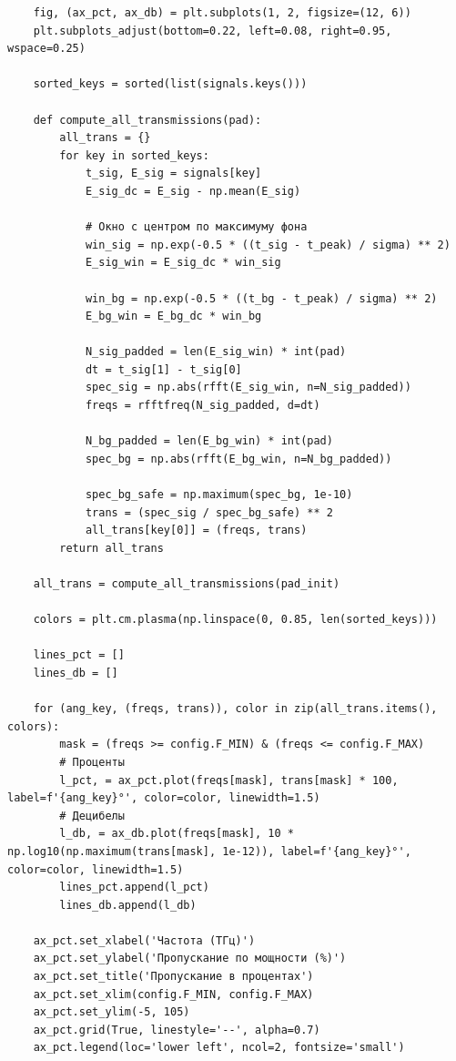\begin{verbatim}
    fig, (ax_pct, ax_db) = plt.subplots(1, 2, figsize=(12, 6))
    plt.subplots_adjust(bottom=0.22, left=0.08, right=0.95, wspace=0.25)
    
    sorted_keys = sorted(list(signals.keys()))
    
    def compute_all_transmissions(pad):
        all_trans = {}
        for key in sorted_keys:
            t_sig, E_sig = signals[key]
            E_sig_dc = E_sig - np.mean(E_sig)
            
            # Окно с центром по максимуму фона
            win_sig = np.exp(-0.5 * ((t_sig - t_peak) / sigma) ** 2)
            E_sig_win = E_sig_dc * win_sig
            
            win_bg = np.exp(-0.5 * ((t_bg - t_peak) / sigma) ** 2)
            E_bg_win = E_bg_dc * win_bg
            
            N_sig_padded = len(E_sig_win) * int(pad)
            dt = t_sig[1] - t_sig[0]
            spec_sig = np.abs(rfft(E_sig_win, n=N_sig_padded))
            freqs = rfftfreq(N_sig_padded, d=dt)
            
            N_bg_padded = len(E_bg_win) * int(pad)
            spec_bg = np.abs(rfft(E_bg_win, n=N_bg_padded))
            
            spec_bg_safe = np.maximum(spec_bg, 1e-10)
            trans = (spec_sig / spec_bg_safe) ** 2
            all_trans[key[0]] = (freqs, trans)
        return all_trans

    all_trans = compute_all_transmissions(pad_init)
    
    colors = plt.cm.plasma(np.linspace(0, 0.85, len(sorted_keys)))
    
    lines_pct = []
    lines_db = []
    
    for (ang_key, (freqs, trans)), color in zip(all_trans.items(), colors):
        mask = (freqs >= config.F_MIN) & (freqs <= config.F_MAX)
        # Проценты
        l_pct, = ax_pct.plot(freqs[mask], trans[mask] * 100, label=f'{ang_key}°', color=color, linewidth=1.5)
        # Децибелы
        l_db, = ax_db.plot(freqs[mask], 10 * np.log10(np.maximum(trans[mask], 1e-12)), label=f'{ang_key}°', color=color, linewidth=1.5)
        lines_pct.append(l_pct)
        lines_db.append(l_db)
        
    ax_pct.set_xlabel('Частота (ТГц)')
    ax_pct.set_ylabel('Пропускание по мощности (%)')
    ax_pct.set_title('Пропускание в процентах')
    ax_pct.set_xlim(config.F_MIN, config.F_MAX)
    ax_pct.set_ylim(-5, 105)
    ax_pct.grid(True, linestyle='--', alpha=0.7)
    ax_pct.legend(loc='lower left', ncol=2, fontsize='small')
    

\end{verbatim}

